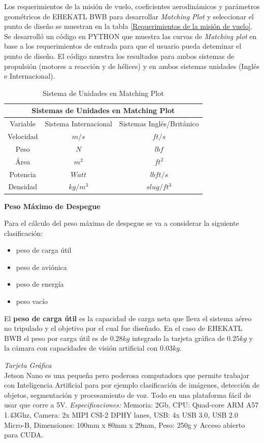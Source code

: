 %
Los requerimientos de la misión de vuelo, coeficientes aerodinámicos y parámetros geométricos de EHEKATL BWB para desarrollar \textit{Matching Plot} y seleccionar el punto de diseño se muestran en la tabla \ref{Requerimientos de la misión de vuelo}.
%
Se desarrolló un código en PYTHON que muestra las curvas de \textit{Matching plot} en base a los requerimientos de entrada para que el usuario pueda deteminar el punto de diseño.
%
El código muestra los resultados para ambos sistemas de propulsión (motores a reacción y de hélices) y en ambos sistemas unidades (Inglés e Internacional). 
%
\begin{table}[!h]
    \caption{Sistema de Unidades en Matching Plot}
    \centering
    \begin{tabular}{|c|c|c|}
    \hline
    \multicolumn{3}{|c|}{Sistemas de Unidades en Matching Plot}\\
    \hline
     Variable & Sistema Internacional & Sistemas Inglés/Británico  \\
     \hline
     Velocidad    & $m/s$ & $ft/s$ \\
     Peso & $N$ & $lbf$ \\
     Área & $m^2$ & $ft^2$ \\
     Potencia & $Watt$ & $lb ft/s$ \\
     Densidad & $kg / m^3$ & $slug/ft^3$\\
     \hline
    \end{tabular}
    \label{US Matching plot}
\end{table}


\medskip
\textbf{Peso Máximo de Despegue}

Para el cálculo del peso máximo de despegue se va a considerar la siguiente clasificación:
\begin{itemize}
    \item peso de carga útil
    \item peso de aviónica
    \item peso de energía
    \item peso vacío
\end{itemize}


El \textbf{peso de carga útil} es la capacidad de carga neta que lleva el sistema aéreo no tripulado y el objetivo por el cual fue diseñado. 
En el caso de EHEKATL BWB el peso por carga útil es de $0.28kg$ integrado la tarjeta gráfica de $0.25kg$ y la cámara con capacidades de visión artificial con $0.03kg$. 

\textit{Tarjeta Gráfica}\\
Jetson Nano es una pequeña pero poderosa computadora que permite trabajar con Inteligencia Artificial para por ejemplo clasificación de imágenes, detección de objetos, segmentación y procesamiento de voz. Todo en una plataforma fácil de usar que corre a 5V. 
\textit{Especificaciones:}
Memoria: 2Gb, CPU: Quad-core ARM A57 1.43Ghz, Camera: 2x MIPI CSI-2 DPHY lanes, USB: 4x USB 3.0, USB 2.0 Micro-B, Dimensiones: 100mm x 80mm x 29mm, Peso: 250g y Acceso abierto para CUDA. 

